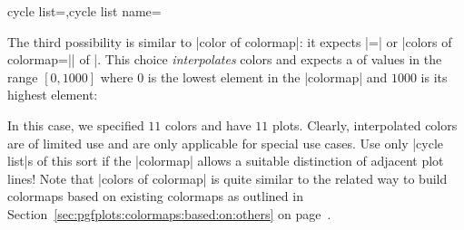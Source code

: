 \begin{pgfplotskeylist}{cycle list=,cycle list name=}
{    The third possibility is similar to |color of colormap|: it expects
    |=| or
    |colors of colormap=|| of |. This choice
    \emph{interpolates} colors and expects a  of values in the range
    $[0,1000]$ where $0$ is the lowest element in the |colormap| and $1000$ is
    its highest element:
\begin{codeexample}[]
\end{codeexample}
    In this case, we specified $11$ colors and have $11$ plots. Clearly,
    interpolated colors are of limited use and are only applicable for special
    use cases. Use only |cycle list|s of this sort if the |colormap| allows a
    suitable distinction of adjacent plot lines! Note that |colors of colormap|
    is quite similar to the related way to build colormaps based on existing
    colormaps as outlined in
    Section~\ref{sec:pgfplots:colormaps:based:on:others} on
    page~\pageref{sec:pgfplots:colormaps:based:on:others}.

}
\end{pgfplotskeylist}

